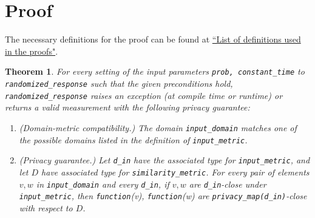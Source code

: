 \documentclass[11pt,a4paper]{article}
\newtheorem{theorem}{Theorem}[section]
\theoremstyle{definition}
\begin{document}
\section{Proof}
The necessary definitions for the proof can be found at \href{https://github.com/opendp/whitepapers/blob/proof-defns/proof-defns/proof_defns.pdf}{``List of definitions used in the proofs"}. %
\begin{theorem} For every setting of the input parameters \texttt{prob, constant\_time} to \\ \texttt{randomized\_response} such that the given preconditions hold, \texttt{randomized\_response} raises an exception (at compile time or runtime) or returns a valid measurement with the following privacy guarantee:
\begin{enumerate}  %
    \item  \textup{(Domain-metric compatibility.)} The domain \texttt{input\_domain} matches one of the possible domains listed in the definition of \texttt{input\_metric}. 
    
    \item \textup{(Privacy guarantee.)} Let \texttt{d\_in} have the associated type for \texttt{input\_metric}, and let $D$ have associated type for \texttt{similarity\_metric}. For every pair of elements $v, w$ in \texttt{input\_domain} and every \texttt{d\_in}, if $v, w$ are \texttt{d\_in}-close under \texttt{input\_metric}, then \texttt{function}(v), \texttt{function}(w) are \texttt{privacy\_map(d\_in)}-close with respect to $D$.
\end{enumerate}
\end{theorem}
\end{document}
